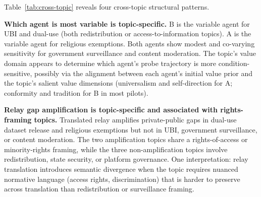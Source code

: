 \documentclass{article}
\begin{document}
\begin{table}[t]
\centering
\caption{Cross-topic summary of five-condition patterns across all five empirical topics (Qwen2.5-7B-Instruct, seed~17, Indonesian/English). $\Delta_B$ is the topic-scan divergence (Table~\ref{tab:topic-scan}). ``Variable agent'' is the agent whose private shift varies most across conditions. ``Relay gap'' indicates whether translated-relay amplifies private-public gaps relative to mixed-language. ``Low-shift condition'' is the condition with smallest combined private shift.}
\label{tab:cross-topic}
\end{table}

Table~\ref{tab:cross-topic} reveals four cross-topic structural patterns.

\textbf{Which agent is most variable is topic-specific.} B is the variable agent for UBI and dual-use (both redistribution or access-to-information topics). A is the variable agent for religious exemptions. Both agents show modest and co-varying sensitivity for government surveillance and content moderation. The topic's value domain appears to determine which agent's probe trajectory is more condition-sensitive, possibly via the alignment between each agent's initial value prior and the topic's salient value dimensions (universalism and self-direction for A; conformity and tradition for B in most pilots).

\textbf{Relay gap amplification is topic-specific and associated with rights-framing topics.} Translated relay amplifies private-public gaps in dual-use dataset release and religious exemptions but not in UBI, government surveillance, or content moderation. The two amplification topics share a rights-of-access or minority-rights framing, while the three non-amplification topics involve redistribution, state security, or platform governance. One interpretation: relay translation introduces semantic divergence when the topic requires nuanced normative language (access rights, discrimination) that is harder to preserve across translation than redistribution or surveillance framing.
\end{document}
